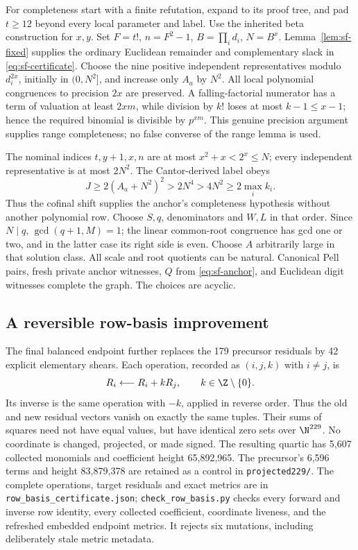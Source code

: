For completeness start with a finite refutation, expand to its proof tree,
and pad \(t\ge12\) beyond every local parameter and label. Use the
inherited beta construction for \(x,y\). Set
\(F=t!\), \(n=F^2-1\), \(B=\prod_i d_i\), \(N=B^x\).
Lemma~\ref{lem:sf-fixed} supplies the ordinary Euclidean remainder
and complementary slack in \eqref{eq:sf-certificate}.
Choose the nine positive independent representatives modulo
\(d_i^{2x}\), initially in \((0,N^2]\), and increase only \(A_a\)
by \(N^2\). All local polynomial congruences to precision \(2x\)
are preserved. A falling-factorial numerator has a term of valuation
at least \(2xm\), while division by \(k!\) loses at most
\(k-1\le x-1\); hence the required binomial is divisible by
\(p^{xm}\). This genuine precision argument supplies range
completeness; no false converse of the range lemma is used.

The nominal indices \(t,y+1,x,n\) are at most
\(x^2+x<2^x\le N\); every independent representative is at most
\(2N^2\). The Cantor-derived label obeys
\[
 J\ge2(A_a+N^2)^2>2N^4>4N^2\ge2\max_i k_i.
\]
Thus the cofinal shift supplies the anchor's completeness hypothesis
without another polynomial row. Choose \(S,q\), denominators and
\(W,L\) in that order. Since \(N\mid q\),
\(\gcd(q+1,M)=1\); the linear common-root congruence has gcd one or
two, and in the latter case its right side is even. Choose \(A\)
arbitrarily large in that solution class. All scale and root quotients
can be natural. Canonical Pell pairs, fresh private anchor witnesses,
\(Q\) from \eqref{eq:sf-anchor}, and Euclidean digit witnesses
complete the graph. The choices are acyclic.

\subsection{A reversible row-basis improvement}
The final balanced endpoint further replaces the 179 precursor residuals
by 42 explicit elementary shears. Each operation, recorded as
\((i,j,k)\) with \(i\ne j\), is
\[
 R_i\longleftarrow R_i+kR_j,\qquad k\in\Z\setminus\{0\}.
\]
Its inverse is the same operation with \(-k\), applied in reverse order.
Thus the old and new residual vectors vanish on exactly the same tuples.
Their sums of squares need not have equal values, but have identical zero
sets over \(\N^{229}\). No coordinate is changed, projected, or made signed.
The resulting quartic has 5,607 collected monomials and coefficient height
65,892,965. The precursor's 6,596 terms and height 83,879,378 are retained
as a control in \texttt{projected229/}.
The complete operations, target residuals and exact metrics are in
\texttt{row\_basis\_certificate.json}; \texttt{check\_row\_basis.py}
checks every forward and inverse row identity, every collected coefficient,
coordinate liveness, and the refreshed embedded endpoint metrics. It rejects
six mutations, including deliberately stale metric metadata.

